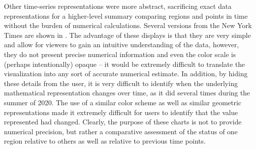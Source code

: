 \documentclass[article]{jdssv}\usepackage[]{graphicx}\usepackage[]{xcolor}
\begin{document}
Other time-series representations were more abstract, sacrificing exact data representations for a higher-level summary comparing regions and points in time without the burden of numerical calculations. Several versions from the New York Times are shown in . The advantage of these displays is that they are very simple and allow for viewers to gain an intuitive understanding of the data, however, they do not present precise numerical information and even the color scale is (perhaps intentionally) opaque -- it would be extremely difficult to translate the visualization into any sort of accurate numerical estimate. In addition, by hiding these details from the user, it is very difficult to identify when the underlying mathematical representation changes over time, as it did several times during the summer of 2020. The use of a similar color scheme as well as similar geometric representations made it extremely difficult for users to identify that the value represented had changed. Clearly, the purpose of these charts is not to provide numerical precision, but rather a comparative assessment of the status of one region relative to others as well as relative to previous time points. 

% 
% 
\end{document}
